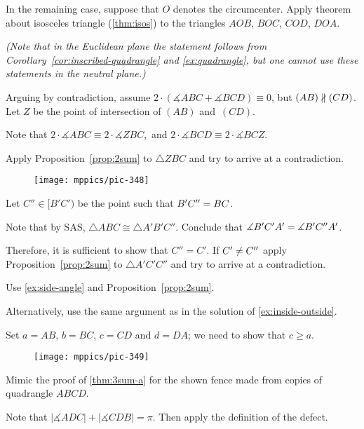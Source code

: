In the remaining case, suppose that $O$ denotes the circumcenter.
Apply theorem about isosceles triangle (\ref{thm:isos}) to the triangles 
$AOB$,
$BOC$, 
$COD$, 
$DOA$. 

\textit{(Note that in the Euclidean plane the statement follows from Corollary~\ref{cor:inscribed-quadrangle} and \ref{ex:quadrangle},
but one cannot use these statements in the neutral plane.)}

Arguing by contradiction, 
assume 
$2\cdot(\measuredangle ABC+\measuredangle BCD)\equiv0$, 
but $(AB)\z\nparallel(C D)$.
Let $Z$ be the point of intersection of $(AB)$ and~$(CD)$.

Note that 
$
2\cdot \measuredangle ABC\equiv 2\cdot \measuredangle ZBC,
$ and
$2\cdot \measuredangle BCD\equiv 2\cdot \measuredangle BCZ$.

Apply Proposition~\ref{prop:2sum} to $\triangle ZBC$ and try to arrive at a contradiction.

\begin{wrapfigure}{r}{31mm}
\vskip-0mm
\centering
\texttt{[image: mppics/pic-348]}
\end{wrapfigure}

Let $C''\in [B'C')$ be the point such that $B'C''\z=BC$.

Note that by SAS, $\triangle ABC\cong \triangle A'B'C''$.
Conclude that $\measuredangle B'C'A'\z= \measuredangle B'C''A'$.

Therefore, it is sufficient to show that $C''=C'$.
If $C'\z\ne C''$ apply Proposition~\ref{prop:2sum} to $\triangle A'C'C''$ and try to arrive at a contradiction.


Use \ref{ex:side-angle} and Proposition~\ref{prop:2sum}.

Alternatively, use the same argument as in the solution of \ref{ex:inside-outside}.

Set $a=AB$, $b=BC$, $c=CD$ and $d=DA$; we need to show that $c\ge a$.

\begin{figure}[!ht]
\vskip-0mm
\centering
\texttt{[image: mppics/pic-349]}
\end{figure}

Mimic the proof of \ref{thm:3sum-a} for the shown fence made from copies of quadrangle $ABCD$. 

Note that 
$|\measuredangle ADC|+|\measuredangle CDB|=\pi$.
Then apply the definition of the defect.

